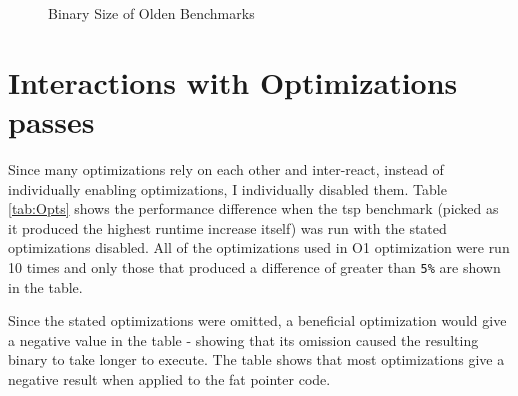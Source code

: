 \begin{figure}
\centering
{}
\caption{Binary Size of Olden Benchmarks}
\label{fig:BinSize}
\end{figure}


\section{Interactions with Optimizations passes}

Since many optimizations rely on each other and inter-react, instead of individually enabling optimizations, I individually disabled them.
Table \ref{tab:Opts} shows the performance difference when the tsp benchmark (picked as it produced the highest runtime increase itself) was run with the stated optimizations disabled.
All of the optimizations used in O1 optimization were run 10 times and only those that produced a difference of greater than \verb!5%! are shown in the table.

Since the stated optimizations were omitted, a beneficial optimization would give a negative value in the table - showing that its omission caused the resulting binary to take longer to execute.
The table shows that most optimizations give a negative result when applied to the fat pointer code.

